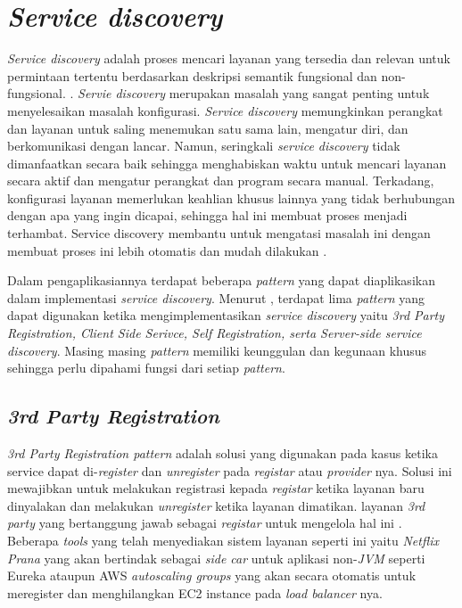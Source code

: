 \section{\textit{Service discovery}}

\textit{Service discovery} adalah proses mencari layanan yang tersedia dan relevan untuk permintaan tertentu berdasarkan deskripsi semantik fungsional dan non-fungsional. \parencite{klusch2014servicediscovery}. \textit{Servie discovery} merupakan masalah yang sangat penting untuk menyelesaikan masalah konfigurasi. \textit{Service discovery} memungkinkan perangkat dan layanan untuk saling menemukan satu sama lain, mengatur diri, dan berkomunikasi dengan lancar. Namun, seringkali \textit{service discovery} tidak dimanfaatkan secara baik sehingga menghabiskan waktu untuk mencari layanan secara aktif dan mengatur perangkat dan program secara manual. Terkadang, konfigurasi layanan memerlukan keahlian khusus lainnya yang tidak berhubungan dengan apa yang ingin dicapai, sehingga hal ini membuat proses menjadi terhambat. Service discovery membantu untuk mengatasi masalah ini dengan membuat proses ini lebih otomatis dan mudah dilakukan \parencite{ServiceDiscovery}.

Dalam pengaplikasiannya terdapat beberapa \textit{pattern} yang dapat diaplikasikan dalam implementasi \textit{service discovery}. Menurut \parencite{micoservicearchitecture}, terdapat lima \textit{pattern} yang dapat digunakan ketika mengimplementasikan \textit{service discovery} yaitu \textit{3rd Party Registration, Client Side Serivce, Self Registration, serta Server-side service discovery}. Masing masing \textit{pattern} memiliki keunggulan dan kegunaan khusus sehingga perlu dipahami fungsi dari setiap \textit{pattern}.

\subsection{\textit{3rd Party Registration}}
\textit{3rd Party Registration pattern} adalah solusi yang digunakan pada kasus ketika service dapat di-\textit{register} dan \textit{unregister} pada \textit{registar} atau \textit{provider} nya. Solusi ini mewajibkan untuk melakukan registrasi kepada \textit{registar} ketika layanan baru dinyalakan dan melakukan \textit{unregister} ketika layanan dimatikan. layanan \textit{3rd party} yang bertanggung jawab sebagai \textit{registar} untuk mengelola hal ini \parencite{3rdpartyintegration}. Beberapa \textit{tools} yang telah menyediakan sistem layanan seperti ini yaitu \textit{Netflix Prana} yang akan bertindak sebagai \textit{side car} untuk aplikasi non-\textit{JVM} seperti Eureka ataupun AWS \textit{autoscaling groups} yang akan secara otomatis untuk meregister dan menghilangkan EC2 instance pada \textit{load balancer} nya.

